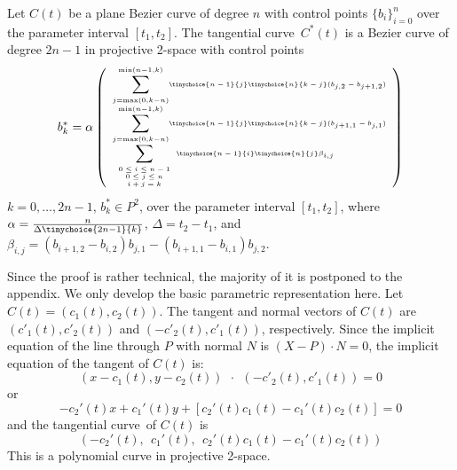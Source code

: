 \documentclass[10pt,twocolumn]{article}
\newcommand{\tang}{tangential curve\ }
\begin{document}
\begin{theorem}
\label{thm:Bezier}
Let $C(t)$ be a plane Bezier curve of degree $n$
with control points $\{ b_i \}_{i=0}^n$ 
over the parameter interval $[t_1,t_2]$.
The \tang $C^*(t)$ is a Bezier curve
of degree $2n-1$ in projective 2-space with control points 
\begin{equation}
\label{eq:dualcoord}
\tiny{
b^*_k = \alpha
\left(
\begin{array}{l}
	\displaystyle{\sum_{j=\mbox{\tiny{max}}(0,k-n)}^{\mbox{\tiny{min}}(n-1,k)}}
	\tinychoice{n-1}{j} \tinychoice{n}{k-j} (b_{j,2} - b_{j+1,2})\\
	\displaystyle{\sum_{j=\mbox{\tiny{max}}(0,k-n)}^{\mbox{\tiny{min}}(n-1,k)}}
	\tinychoice{n-1}{j} \tinychoice{n}{k-j} (b_{j+1,1} - b_{j,1})\\
\displaystyle{\sum_{\begin{array}{c} \mbox{\tiny{$0 \leq i \leq n-1$}} \\ 
		       \mbox{\tiny{$0 \leq j \leq n$}} \\ 
		       \mbox{\tiny{$i+j=k$}}
      \end{array}}}
\tinychoice{n-1}{i} \tinychoice{n}{j} \beta_{i,j}
\end{array}
\right)}
\end{equation}
$k=0,\ldots,2n-1$, $b^*_k \in P^2$, 
over the parameter interval $[t_1,t_2]$, where
$\alpha = \tiny{\frac{n}{\Delta \tinychoice{2n-1}{k}}}$,
$\Delta = t_2 - t_1$, and
$\beta_{i,j} = (b_{i+1,2} - b_{i,2}) b_{j,1} - (b_{i+1,1} - b_{i,1}) b_{j,2}$.
\end{theorem}
\prf
Since the proof is rather technical, the majority of it is postponed to the appendix.
We only develop the basic parametric representation here.
Let $C(t) = (c_1(t), c_2(t))$.
The tangent and normal vectors of $C(t)$ are $(c'_1(t),c'_2(t))$
and $(-c'_2(t), c'_1(t))$, respectively.
Since the implicit equation of the line through $P$ with normal $N$ is 
$(X-P) \cdot N = 0$,
the implicit equation of the tangent of $C(t)$ is:
\[	
	(x-c_1(t), y-c_2(t))\ \  \cdot \ \ (-c'_2(t), c'_1(t)) = 0
\]
or
\[
	-c_2'(t) x + c_1'(t) y + [c_2'(t) c_1(t) - c_1'(t)c_2(t)] = 0 
\]
and the \tang of $C(t)$ is
\begin{equation}
\label{eq:dual1}
  (-c_2'(t),\ \  c_1'(t),\ \ c_2'(t) c_1(t) - c_1'(t)c_2(t))
\end{equation}
%
This is a polynomial curve in projective 2-space.
\QED
\end{document}
